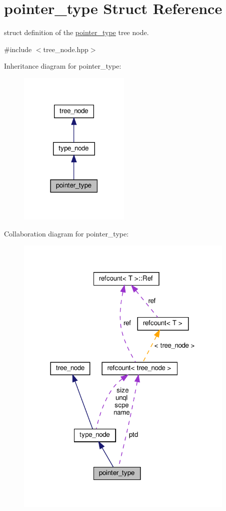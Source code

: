 \hypertarget{structpointer__type}{}\section{pointer\+\_\+type Struct Reference}
\label{structpointer__type}


struct definition of the \hyperlink{structpointer__type}{pointer\+\_\+type} tree node.  




{\ttfamily \#include $<$tree\+\_\+node.\+hpp$>$}



Inheritance diagram for pointer\+\_\+type\+:
\nopagebreak
\begin{figure}[H]
\begin{center}
\leavevmode
\includegraphics[width=150pt]{d5/dfd/structpointer__type__inherit__graph}
\end{center}
\end{figure}


Collaboration diagram for pointer\+\_\+type\+:
\nopagebreak
\begin{figure}[H]
\begin{center}
\leavevmode
\includegraphics[width=297pt]{db/da5/structpointer__type__coll__graph}
\end{center}
\end{figure}
